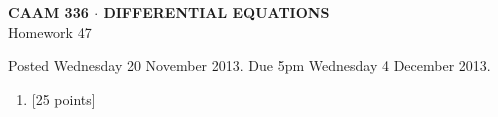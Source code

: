 \documentclass[10pt]{article}
\begin{document}
\vspace*{-5em}
\begin{center}
\large \textsf{\textbf{CAAM 336 $\cdot$ DIFFERENTIAL EQUATIONS}\\[0.5em]
Homework 47 }
\end{center}

Posted Wednesday 20 November 2013.  Due 5pm Wednesday 4 December 2013.

\begin{enumerate}\addtocounter{enumi}{46}
\item {[25 points]}  
\end{enumerate}
\end{document}
